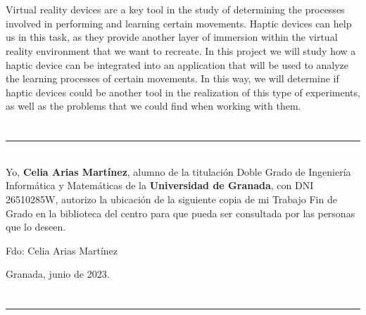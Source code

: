 \\

\vspace{0.7cm}
\\

Virtual reality devices are a key tool in the study of determining the processes involved in performing and learning certain movements. Haptic devices can help us in this task, as they provide another layer of immersion within the virtual reality environment that we want to recreate. In this project we will study how a haptic device can be integrated into an application that will be used to analyze  the learning processes of certain movements. In this way, we will determine if haptic devices could be another tool in the realization of this type of experiments, as well as the problems that we could find when working with them.

\chapter*{}
\thispagestyle{empty}

\noindent\rule[-1ex]{\textwidth}{2pt}\\[4.5ex]

Yo, \textbf{Celia Arias Martínez}, alumno de la titulación Doble Grado de Ingeniería Informática y Matemáticas de la \textbf{Universidad de Granada}, con DNI 26510285W, autorizo la
ubicación de la siguiente copia de mi Trabajo Fin de Grado en la biblioteca del centro para que pueda ser
consultada por las personas que lo deseen.

\vspace{6cm}

\noindent Fdo: Celia Arias Martínez

\vspace{2cm}

\begin{flushright}
Granada, junio de 2023.
\end{flushright}


\chapter*{}
\thispagestyle{empty}

\noindent\rule[-1ex]{\textwidth}{2pt}\\[4.5ex]

